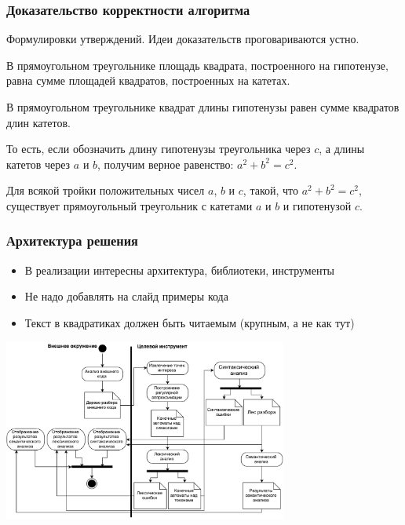 \documentclass
  [aspectratio=1610] %
  {beamer}
\begin{document}
\begin{frame}
    \frametitle{Доказательство корректности алгоритма}
    {\small Формулировки утверждений. Идеи доказательств проговариваются устно.}
    \begin{rutheorem}
        В прямоугольном треугольнике площадь квадрата, построенного на гипотенузе, равна сумме площадей квадратов, построенных на катетах.
    \end{rutheorem}

    \begin{rutheorem}
        В прямоугольном треугольнике квадрат длины гипотенузы равен сумме квадратов длин катетов.

        То есть, если обозначить длину гипотенузы треугольника через $c$, а длины катетов
        через $a$ и $b$, получим верное равенство: $a^2 + b^2 = c^2$.
    \end{rutheorem}

    \begin{rutheorem}
        Для всякой тройки положительных чисел $a$, $b$ и $c$, такой, что $a^2 + b^2 = c^2$, существует прямоугольный треугольник с катетами $a$ и $b$ и гипотенузой $c$.
    \end{rutheorem}
\end{frame}

\begin{frame}
    \frametitle{Архитектура решения}
    \begin{itemize}
        \item В реализации интересны архитектура, библиотеки, инструменты
        \item Не надо добавлять на слайд примеры кода
        \item Текст в квадратиках должен быть читаемым (крупным, а не как тут)
    \end{itemize}
    \begin{center}
        \includegraphics[width=0.7\textwidth]{figures/Activ_SEL_Processing.pdf}
    \end{center}
\end{frame}
\end{document}
